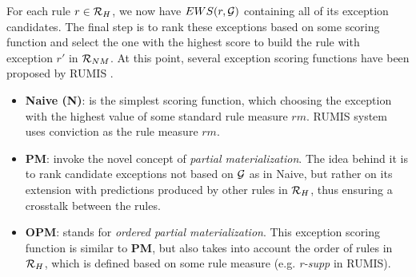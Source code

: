 For each rule $r \in \mathcal{R}_H$, we now have $EWS(r,\mathcal{G})$ containing all of its exception candidates. The final step is to rank these exceptions based on some scoring function and select the one with the highest score to build the rule with exception $r'$ in $\mathcal{R}_{NM}$. At this point, several exception scoring functions have been proposed by RUMIS \cite{rumis}.
\begin{itemize}
\item \textbf{Naive (N)}: is the simplest scoring function, which choosing the exception with the highest value of some standard rule measure $rm$. RUMIS system uses conviction as the rule measure $rm$.
\item \textbf{PM}: invoke the novel concept of \textit{partial materialization}. The idea behind it is to rank candidate exceptions not based on $\mathcal{G}$ as in Naive, but rather on its
extension with predictions produced by other rules in $\mathcal{R}_H$, thus ensuring a crosstalk between the rules.
\item \textbf{OPM}: stands for \textit{ordered partial materialization}. This exception scoring function is similar to \textbf{PM}, but also takes into account the order of rules in $\mathcal{R}_{H}$, which is defined based on some rule measure (e.g. \textit{r-supp} in RUMIS).

\end{itemize}





